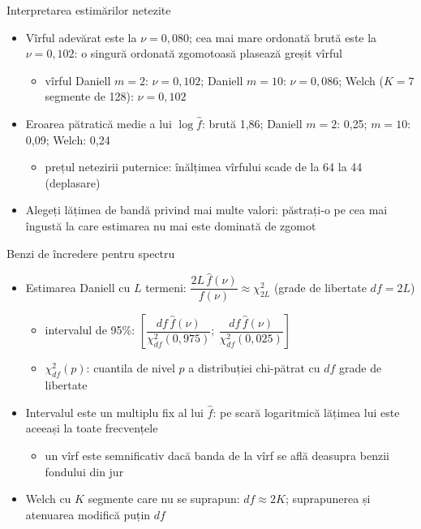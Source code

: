 \begin{frame}{Interpretarea estimărilor netezite}
\itemsize{\small}
\begin{itemize}
    \item Vîrful adevărat este la $\nu = 0{,}080$; cea mai mare ordonată brută este la $\nu = 0{,}102$: o singură ordonată zgomotoasă plasează greșit vîrful
    \begin{itemize}
        \item vîrful Daniell $m = 2$: $\nu = 0{,}102$; Daniell $m = 10$: $\nu = 0{,}086$; Welch ($K = 7$ segmente de 128): $\nu = 0{,}102$
    \end{itemize}
    \item Eroarea pătratică medie a lui $\log\hat f$: brută 1{,}86; Daniell $m = 2$: 0{,}25; $m = 10$: 0{,}09; Welch: 0{,}24
    \begin{itemize}
        \item prețul netezirii puternice: înălțimea vîrfului scade de la 64 la 44 (deplasare)
    \end{itemize}
    \item Alegeți lățimea de bandă privind mai multe valori: păstrați-o pe cea mai îngustă la care estimarea nu mai este dominată de zgomot
\end{itemize}
\end{frame}

\begin{frame}{Benzi de încredere pentru spectru}
\itemsize{\footnotesize}
\begin{itemize}
    \item Estimarea Daniell cu $L$ termeni: $\dfrac{2L\,\hat f(\nu)}{f(\nu)} \approx \chi^2_{2L}$ (grade de libertate $df = 2L$)
    \begin{itemize}
        \item intervalul de 95\%: $\left[\dfrac{df\,\hat f(\nu)}{\chi^2_{df}(0{,}975)};\ \dfrac{df\,\hat f(\nu)}{\chi^2_{df}(0{,}025)}\right]$
        \item $\chi^2_{df}(p)$: cuantila de nivel $p$ a distribuției chi-pătrat cu $df$ grade de libertate
    \end{itemize}
    \item Intervalul este un multiplu fix al lui $\hat f$: pe scară logaritmică lățimea lui este aceeași la toate frecvențele
    \begin{itemize}
        \item un vîrf este semnificativ dacă banda de la vîrf se află deasupra benzii fondului din jur
    \end{itemize}
    \item Welch cu $K$ segmente care nu se suprapun: $df \approx 2K$; suprapunerea și atenuarea modifică puțin $df$
\end{itemize}
\end{frame}

